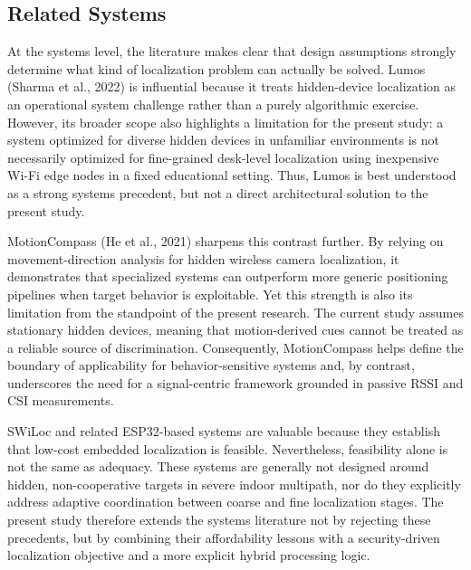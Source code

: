 \subsection{Related Systems}
At the systems level, the literature makes clear that design assumptions strongly determine what kind of localization problem can actually be solved. Lumos (Sharma et al., 2022) is influential because it treats hidden-device localization as an operational system challenge rather than a purely algorithmic exercise. However, its broader scope also highlights a limitation for the present study: a system optimized for diverse hidden devices in unfamiliar environments is not necessarily optimized for fine-grained desk-level localization using inexpensive Wi-Fi edge nodes in a fixed educational setting. Thus, Lumos is best understood as a strong systems precedent, but not a direct architectural solution to the present study.

MotionCompass (He et al., 2021) sharpens this contrast further. By relying on movement-direction analysis for hidden wireless camera localization, it demonstrates that specialized systems can outperform more generic positioning pipelines when target behavior is exploitable. Yet this strength is also its limitation from the standpoint of the present research. The current study assumes stationary hidden devices, meaning that motion-derived cues cannot be treated as a reliable source of discrimination. Consequently, MotionCompass helps define the boundary of applicability for behavior-sensitive systems and, by contrast, underscores the need for a signal-centric framework grounded in passive RSSI and CSI measurements.

SWiLoc and related ESP32-based systems are valuable because they establish that low-cost embedded localization is feasible. Nevertheless, feasibility alone is not the same as adequacy. These systems are generally not designed around hidden, non-cooperative targets in severe indoor multipath, nor do they explicitly address adaptive coordination between coarse and fine localization stages. The present study therefore extends the systems literature not by rejecting these precedents, but by combining their affordability lessons with a security-driven localization objective and a more explicit hybrid processing logic.

